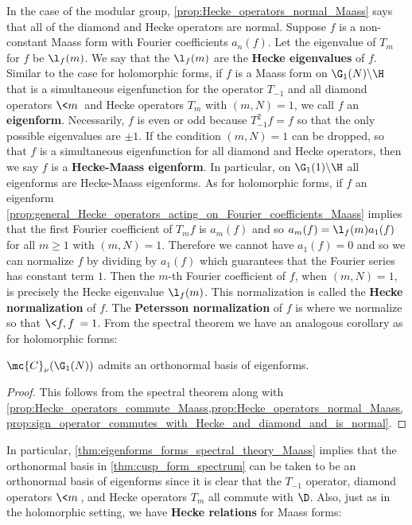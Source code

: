     In the case of the modular group, \cref{prop:Hecke_operators_normal_Maass} says that all of the diamond and Hecke operators are normal. Suppose $f$ is a non-constant Maass form with Fourier coefficients $a_{n}(f)$. Let the eigenvalue of $T_{m}$ for $f$ be $\l_{f}(m)$. We say that the $\l_{f}(m)$ are the \textbf{Hecke eigenvalues} of $f$. Similar to the case for holomorphic forms, if $f$ is a Maass form on $\G_{1}(N)\backslash\H$ that is a simultaneous eigenfunction for the operator $T_{-1}$ and all diamond operators $\<m\>$ and Hecke operators $T_{m}$ with $(m,N) = 1$, we call $f$ an \textbf{eigenform}. Necessarily, $f$ is even or odd because $T_{-1}^{2}f = f$ so that the only possible eigenvalues are $\pm 1$. If the condition $(m,N) = 1$ can be dropped, so that $f$ is a simultaneous eigenfunction for all diamond and Hecke operators, then we say $f$ is a \textbf{Hecke-Maass eigenform}. In particular, on $\G_{1}(1)\backslash\H$ all eigenforms are Hecke-Maass eigenforms. As for holomorphic forms, if $f$ an eigenform \cref{prop:general_Hecke_operators_acting_on_Fourier_coefficients_Maass} implies that the first Fourier coefficient of $T_{m}f$ is $a_{m}(f)$ and so $a_{m}(f) = \l_{f}(m)a_{1}(f)$ for all $m \ge 1$ with $(m,N) = 1$. Therefore we cannot have $a_{1}(f) = 0$ and so we can normalize $f$ by dividing by $a_{1}(f)$ which guarantees that the Fourier series has constant term $1$. Then the $m$-th Fourier coefficient of $f$, when $(m,N) = 1$, is precisely the Hecke eigenvalue $\l_{f}(m)$. This normalization is called the \textbf{Hecke normalization} of $f$. The \textbf{Petersson normalization} of $f$ is where we normalize so that $\<f,f\> = 1$. From the spectral theorem we have an analogous corollary as for holomorphic forms:

    \begin{theorem}\label{thm:eigenforms_forms_spectral_theory_Maass}
      $\mc{C}_{\nu}(\G_{1}(N))$ admits an orthonormal basis of eigenforms.
    \end{theorem}
    \begin{proof}
      This follows from the spectral theorem along with \cref{prop:Hecke_operators_commute_Maass,prop:Hecke_operators_normal_Maass,prop:sign_operator_commutes_with_Hecke_and_diamond_and_is_normal}.
    \end{proof}

    In particular, \cref{thm:eigenforms_forms_spectral_theory_Maass} implies that the orthonormal basis in \cref{thm:cusp_form_spectrum} can be taken to be an orthonormal basis of eigenforms since it is clear that the $T_{-1}$ operator, diamond operators $\<m\>$, and Hecke operators $T_{m}$ all commute with $\D$. Also, just as in the holomorphic setting, we have \textbf{Hecke relations} for Maass forms:

